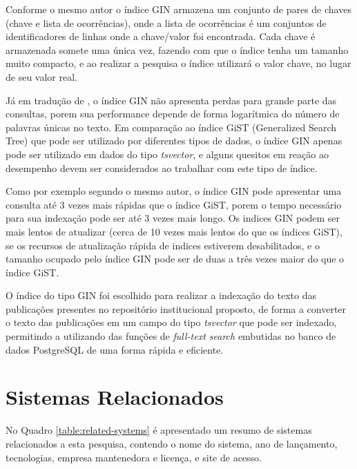Conforme o mesmo autor o índice GIN armazena um conjunto de pares de chaves (chave e lista
de ocorrências), onde a lista de ocorrências é um conjuntos de identificadores de linhas
onde a chave/valor foi encontrada. Cada chave é armazenada somete uma única vez,
fazendo com que o índice tenha um tamanho muito compacto, e ao realizar a pesquisa
o índice utilizará o valor chave, no lugar de seu valor real.

Já em tradução de \cite{2011:PostgreSQL}, o índice GIN não apresenta perdas para
grande parte das consultas, porem sua performance depende de forma logarítmica do
número de palavras únicas no texto. Em comparação ao índice GiST (Generalized Search Tree)
que pode ser utilizado por diferentes tipos de dados, o índice GIN apenas pode ser utilizado
em dados do tipo \emph{tsvector}, e alguns quesitos em reação ao desempenho devem ser considerados
ao trabalhar com este tipo de índice.

Como por exemplo segundo o mesmo autor, o índice GIN pode apresentar uma consulta
até 3 vezes mais rápidas que o índice GiST, porem o tempo necessário para sua indexação
pode ser até 3 vezes mais longo. Os indices GIN podem ser mais lentos
de atualizar (cerca de 10 vezes mais lentos do que os índices GiST), se os recursos de
atualização rápida de indices estiverem desabilitados, e o tamanho ocupado pelo índice
GIN pode ser de duas a três vezes maior do que o índice GiST.

O índice do tipo GIN foi escolhido para realizar a indexação do texto das publicações
presentes no repositório institucional proposto, de forma a converter o texto das
publicações em um campo do tipo \emph{tsvector} que pode ser indexado, permitindo
a utilizando das funções de \emph{full-text search} embutidas no banco de dados PostgreSQL
de uma forma rápida e eficiente.

\section{Sistemas Relacionados}\label{sec:rs}
No Quadro \ref{table:related-systems} é apresentado um resumo de sistemas relacionados
a esta pesquisa, contendo o nome do sistema, ano de lançamento, tecnologias,
empresa mantenedora e licença, e site de acesso.

